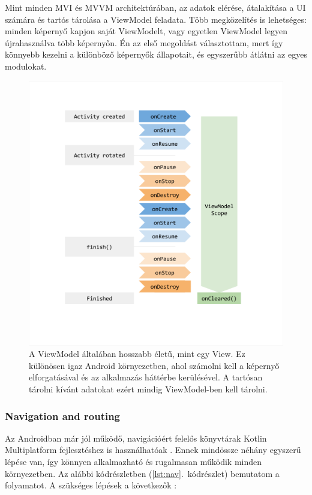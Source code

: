 Mint minden MVI és MVVM architektúrában, az adatok elérése, átalakítása a UI számára és tartós tárolása a ViewModel feladata.  
Több megközelítés is lehetséges: minden képernyő kapjon saját ViewModelt, vagy egyetlen ViewModel legyen újrahasználva több képernyőn.  
Én az első megoldást választottam, mert így könnyebb kezelni a különböző képernyők állapotait, és egyszerűbb átlátni az egyes modulokat.

\begin{figure}[!ht]
    \centering
    \includegraphics[width=130mm, keepaspectratio]{figures/viewmodel-lifecycle.png}
    \caption{A ViewModel általában hosszabb életű, mint egy View. Ez különösen igaz Android környezetben, ahol számolni kell a képernyő elforgatásával és az alkalmazás háttérbe kerülésével. A tartósan tárolni kívánt adatokat ezért mindig ViewModel-ben kell tárolni. \cite{ViewModelAndroid}}
    \label{fig:ViewModel}
\end{figure}

\pagebreak

\subsubsection{Navigation and routing}
\label{sec:Navigation}

Az Androidban már jól működő, navigációért felelős könyvtárak Kotlin Multiplatform fejlesztéshez is használhatóak \cite{NavigationKMP}.  
Ennek mindössze néhány egyszerű lépése van, így könnyen alkalmazható és rugalmasan működik minden környezetben.  
Az alábbi kódrészletben (\ref{lst:nav}.~kódrészlet) bemutatom a folyamatot.  
A szükséges lépések a következők \cite{NavigationKMP}:  


